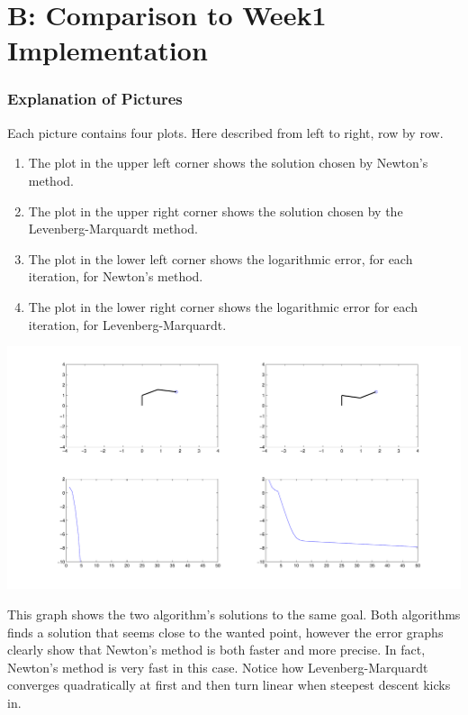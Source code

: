 \documentclass[10pt,oneside,a4paper,final,english]{memoir}
\begin{document}
\section*{B: Comparison to Week1 Implementation}
\subsubsection*{Explanation of Pictures}
Each picture contains four plots. Here described from left to right,
row by row.
\begin{enumerate}
\item The plot in the upper left corner shows the solution chosen by
  Newton's method.
\item The plot in the upper right corner shows the solution chosen by
  the Levenberg-Marquardt method.
\item The plot in the lower left corner shows the logarithmic error,
  for each iteration, for Newton's method.
\item The plot in the lower right corner shows the logarithmic error
  for each iteration, for Levenberg-Marquardt.
\end{enumerate}

\begin{center}
\includegraphics[width=\textwidth]{images/shot1.pdf}\\
\end{center}
This graph shows the two algorithm's solutions to the same goal. Both
algorithms finds a solution that seems close to the wanted point,
however the error graphs clearly show that Newton's method is both
faster and more precise. In fact, Newton's method is very fast in this
case. Notice how Levenberg-Marquardt converges quadratically at first
and then turn linear when steepest descent kicks in.
\end{document}

